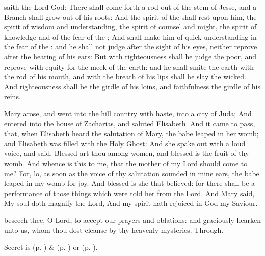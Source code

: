  saith the Lord God: There shall come forth a rod out of the stem of Jesse, and a Branch shall grow out of his roots: And the spirit of the  shall rest upon him, the spirit of wisdom and understanding, the spirit of counsel and might, the spirit of knowledge and of the fear of the ; And shall make him of quick understanding in the fear of the : and he shall not judge after the sight of his eyes, neither reprove after the hearing of his ears: But with righteousness shall he judge the poor, and reprove with equity for the meek of the earth: and he shall smite the earth with the rod of his mouth, and with the breath of his lips shall he slay the wicked. And righteousness shall be the girdle of his loins, and faithfulness the girdle of his reins.


 Mary arose, and went into the hill country with haste, into a city of Juda; And entered into the house of Zacharias, and saluted Elisabeth. And it came to pass, that, when Elisabeth heard the salutation of Mary, the babe leaped in her womb; and Elisabeth was filled with the Holy Ghost: And she spake out with a loud voice, and said, Blessed art thou among women, and blessed is the fruit of thy womb. And whence is this to me, that the mother of my Lord should come to me? For, lo, as soon as the voice of thy salutation sounded in mine ears, the babe leaped in my womb for joy. And blessed is she that believed: for there shall be a performance of those things which were told her from the Lord. And Mary said, My soul doth magnify the Lord, And my spirit hath rejoiced in God my Saviour.


\secret
{} beseech thee, O Lord, to accept our prayers and oblations: and graciously hearken unto us, whom thou dost cleanse by thy heavenly mysteries. Through.
\begin{rubric}
     Secret is  (p. \pageref{SPMaryInAdvent}) \&   (p. \pageref{SPAgainst}) or  (p. \pageref{SPChiefBishop}).
\end{rubric}

